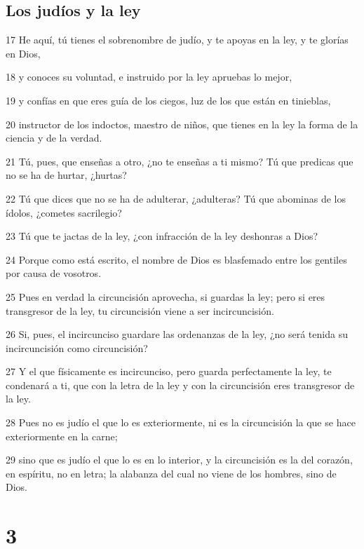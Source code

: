 \section*{Los judíos y la ley}

\par 17 He aquí, tú tienes el sobrenombre de judío, y te apoyas en la ley, y te glorías en Dios,
\par 18 y conoces su voluntad, e instruido por la ley apruebas lo mejor,
\par 19 y confías en que eres guía de los ciegos, luz de los que están en tinieblas,
\par 20 instructor de los indoctos, maestro de niños, que tienes en la ley la forma de la ciencia y de la verdad.
\par 21 Tú, pues, que enseñas a otro, ¿no te enseñas a ti mismo? Tú que predicas que no se ha de hurtar, ¿hurtas?
\par 22 Tú que dices que no se ha de adulterar, ¿adulteras? Tú que abominas de los ídolos, ¿cometes sacrilegio?
\par 23 Tú que te jactas de la ley, ¿con infracción de la ley deshonras a Dios?
\par 24 Porque como está escrito, el nombre de Dios es blasfemado entre los gentiles por causa de vosotros.
\par 25 Pues en verdad la circuncisión aprovecha, si guardas la ley; pero si eres transgresor de la ley, tu circuncisión viene a ser incircuncisión.
\par 26 Si, pues, el incircunciso guardare las ordenanzas de la ley, ¿no será tenida su incircuncisión como circuncisión?
\par 27 Y el que físicamente es incircunciso, pero guarda perfectamente la ley, te condenará a ti, que con la letra de la ley y con la circuncisión eres transgresor de la ley.
\par 28 Pues no es judío el que lo es exteriormente, ni es la circuncisión la que se hace exteriormente en la carne;
\par 29 sino que es judío el que lo es en lo interior, y la circuncisión es la del corazón, en espíritu, no en letra; la alabanza del cual no viene de los hombres, sino de Dios.

\chapter{3}

